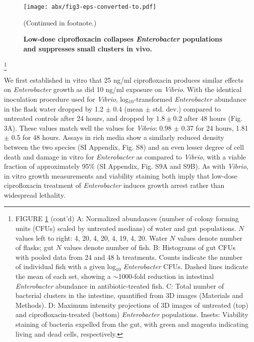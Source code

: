\begin{figure}[h]
	\centerline{
		\texttt{[image: abx/fig3-eps-converted-to.pdf]}}
	\caption{\textbf{Low-dose ciprofloxacin collapses \textit{Enterobacter} populations and suppresses small clusters in vivo.}}{(Continued in footnote.)} 
	\label{fig:fig3}
\end{figure}

{\let\thefootnote\relax\footnote{FIGURE \ref{fig:fig3} (cont'd) A: Normalized abundances (number of colony forming units (CFUs) scaled by untreated medians) of water and gut populations. $N$ values left to right: 4, 20, 4, 20, 4, 19, 4, 20. Water $N$ values denote number of flasks; gut $N$ values denote number of fish. B: Histograms of gut CFUs with pooled data from 24 and 48 h treatments. Counts indicate the number of individual fish with a given log$_{10}$ \textit{Enterobacter} CFUs. Dashed lines indicate the mean of each set, showing a $\sim$1000-fold reduction in intestinal \textit{Enterobacter} abundance in antibiotic-treated fish. C: Total number of bacterial clusters in the intestine, quantified from 3D images (Materials and Methods). D: Maximum intensity projections of 3D images of untreated (top) and ciprofloxacin-treated (bottom) \textit{Enterobacter} populations. Insets: Viability staining of bacteria expelled from the gut, with green and magenta indicating living and dead cells, respectively.}}

We first established in vitro that 25 ng/ml ciprofloxacin produces similar effects on \textit{Enterobacter} growth as did 10 ng/ml exposure on \textit{Vibrio}. With the identical inoculation procedure used for \textit{Vibrio}, log$_{10}$-transformed \textit{Enterobacter} abundance in the flask water dropped by 1.2 $\pm$ 0.4 (mean $\pm$ std. dev.) compared to untreated controls after 24 hours, and dropped by $1.8 \pm 0.2$ after 48 hours (Fig. 3A). These values match well the values for \textit{Vibrio}: 0.98 $\pm$ 0.37 for 24 hours, 1.81 $\pm$ 0.5 for 48 hours. Assays in rich media show a similarly reduced density between the two species (SI Appendix, Fig. S8) and an even lesser degree of cell death and damage in vitro for  \textit{Enterobacter} as compared to \textit{Vibrio}, with a viable fraction of approximately 95\% (SI Appendix, Fig. S9A and S9B). As with \textit{Vibrio}, in vitro growth measurements and viability staining both imply that low-dose ciprofloxacin treatment of \textit{Enterobacter} induces growth arrest rather than widespread lethality.

